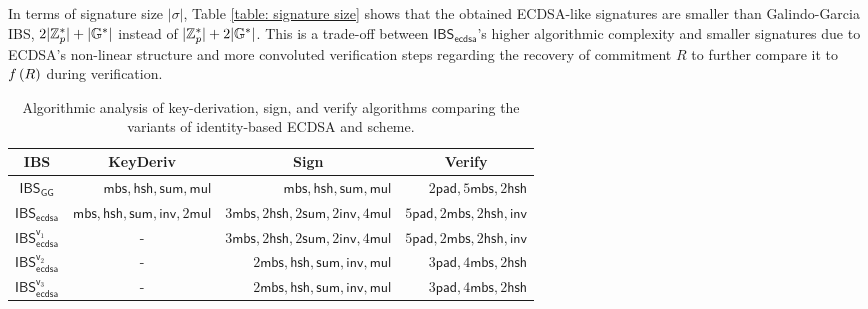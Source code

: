 \documentclass[version=submission, floatrow]{iacrcc}
\begin{document}
In terms of signature size $|\sigma|$, Table \ref{table: signature size} shows that the obtained ECDSA-like signatures are smaller than Galindo-Garcia IBS, $2|\mathbb{Z}_{p}^{\ast}| + |\mathbb{G}^{\ast}|$ instead of $|\mathbb{Z}_{p}^{\ast}| + 2|\mathbb{G}^{\ast}|$. This is a trade-off between $\mathsf{IBS}_{\mathsf{ecdsa}}$'s higher algorithmic complexity and smaller signatures due to ECDSA's non-linear structure and more convoluted verification steps regarding the recovery of commitment $R$ to further compare it to $f\left(R\right)$ during verification.
\begin{table}[H]
    \centering
    \begin{tabular}{c|r|r|r}
         \hline IBS & \multicolumn{1}{c|}{\textsf{KeyDeriv}} & \multicolumn{1}{c|}{\textsf{Sign}} & \multicolumn{1}{c}{\textsf{Verify}} \\
         \hline $\mathsf{IBS}_{\mathsf{GG}}$ & $\mathsf{mbs}, \mathsf{hsh}, \mathsf{sum}, \mathsf{mul}$ & $\mathsf{mbs}, \mathsf{hsh}, \mathsf{sum}, \mathsf{mul}$ & $2 \mathsf{pad}, 5\mathsf{mbs}, 2\mathsf{hsh}$ \\
         \hline $\mathsf{IBS}_{\mathsf{ecdsa}}$ & $\mathsf{mbs}, \mathsf{hsh}, \mathsf{sum}, \mathsf{inv}, 2\mathsf{mul}$ & $3\mathsf{mbs}, 2\mathsf{hsh}, 2\mathsf{sum}, 2\mathsf{inv}, 4\mathsf{mul}$ & $5\mathsf{pad}, 2\mathsf{mbs}, 2\mathsf{hsh}, \mathsf{inv}$ \\
         
         \hline $\mathsf{IBS}_{\mathsf{ecdsa}}^{\mathsf{v}_{1}}$ & \multicolumn{1}{c|}{-} & $3\mathsf{mbs}, 2\mathsf{hsh}, 2\mathsf{sum}, 2\mathsf{inv}, 4\mathsf{mul}$ & $5\mathsf{pad}, 2\mathsf{mbs}, 2\mathsf{hsh}, \mathsf{inv}$ \\
         
         \hline $\mathsf{IBS}_{\mathsf{ecdsa}}^{\mathsf{v}_{2}}$ & \multicolumn{1}{c|}{-} & $2\mathsf{mbs}, \mathsf{hsh}, \mathsf{sum}, \mathsf{inv}, \mathsf{mul}$ & $3\mathsf{pad}, 4\mathsf{mbs}, 2\mathsf{hsh}$ \\
         \hline $\mathsf{IBS}_{\mathsf{ecdsa}}^{\mathsf{v}_{3}}$ & \multicolumn{1}{c|}{-} & $2\mathsf{mbs}, \mathsf{hsh}, \mathsf{sum}, \mathsf{inv}, \mathsf{mul}$ & $3\mathsf{pad}, 4\mathsf{mbs}, 2\mathsf{hsh}$\\
         \hline
    \end{tabular}
    \caption{Algorithmic analysis of key-derivation, sign, and verify algorithms comparing the variants of identity-based ECDSA and \cite{Galindo2009} scheme.}
    \label{table: algorithmic comparison}
\end{table}
\end{document}
